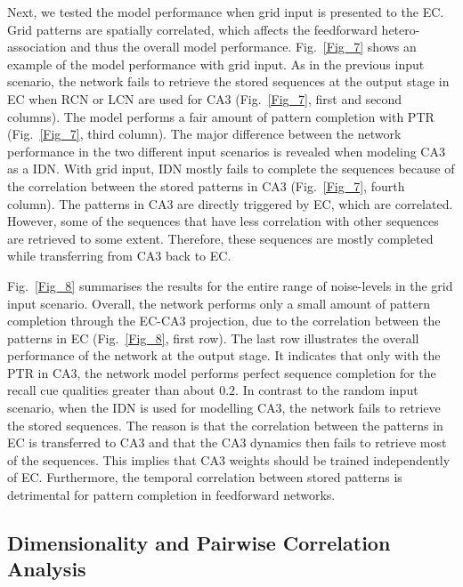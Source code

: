 \documentclass[utf8]{frontiersSCNS} %
\begin{document}
Next, we tested the model performance when grid input is presented to the EC. Grid patterns are spatially correlated, which affects the feedforward hetero-association and thus the overall model performance. Fig.~\ref{Fig_7} shows an example of the model performance with grid input. As in the previous input scenario, the network fails to retrieve the stored sequences at the output stage in EC when RCN or LCN are used for CA3 (Fig.~\ref{Fig_7}, first and second columns). The model performs a fair amount of pattern completion with PTR (Fig.~\ref{Fig_7}, third column). The major difference between the network performance in the two different input scenarios is revealed when modeling CA3 as a IDN. With grid input, IDN mostly fails to complete the sequences because of the correlation between the stored patterns in CA3 (Fig.~\ref{Fig_7}, fourth column). The patterns in CA3 are directly triggered by EC, which are correlated. However, some of the sequences that have less correlation with other sequences are retrieved to some extent. Therefore, these sequences are mostly completed while transferring from CA3 back to EC.

Fig.~\ref{Fig_8} summarises the results for the entire range of noise-levels in the grid input scenario. Overall, the network performs only a small amount of pattern completion through the EC-CA3 projection, due to the correlation between the patterns in EC (Fig.~\ref{Fig_8}, first row). The last row illustrates the overall performance of the network at the output stage. It indicates that only with the PTR in CA3, the network model performs perfect sequence completion for the recall cue qualities greater than about $0.2$. In contrast to the random input scenario, when the IDN is used for modelling CA3, the network fails to retrieve the stored sequences. The reason is that the correlation between the patterns in EC is transferred to CA3 and that the CA3 dynamics then fails to retrieve most of the sequences. This implies that CA3 weights should be trained independently of EC. Furthermore, the temporal correlation between stored patterns is detrimental for pattern completion in feedforward networks. 


\subsection{Dimensionality and Pairwise Correlation Analysis}
\end{document}
